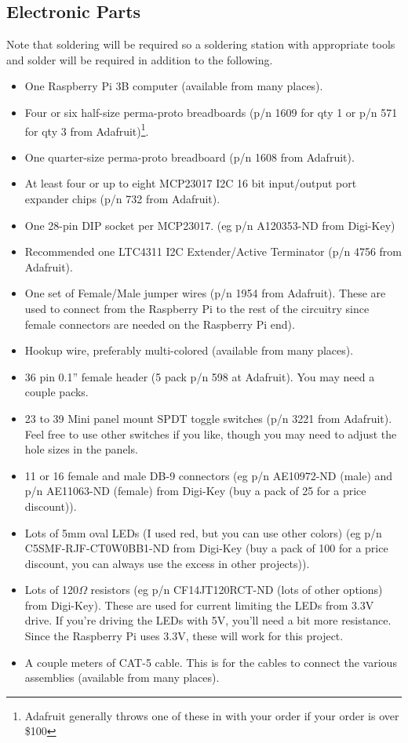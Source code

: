\documentclass[10pt, openany]{book}
\begin{document}
\subsection{Electronic Parts}
Note that soldering will be required so a soldering station with appropriate tools and solder will be required in addition to the following.
\begin{itemize}
  \item One Raspberry Pi 3B computer (available from many places).
  \item Four or six half-size perma-proto breadboards (p/n 1609 for qty 1 or p/n 571 for qty 3 from Adafruit)\footnote{Adafruit generally throws one of these in with your order if your order is over \$100}.
  \item One quarter-size perma-proto breadboard (p/n 1608 from Adafruit).
  \item At least four or up to eight MCP23017 I2C 16 bit input/output port expander chips (p/n 732 from Adafruit).
  \item One 28-pin DIP socket per MCP23017.  (eg p/n A120353-ND from Digi-Key)
  \item Recommended one LTC4311 I2C Extender/Active Terminator (p/n 4756 from Adafruit).
  \item One set of Female/Male jumper wires (p/n 1954 from Adafruit).  These are used to connect from the Raspberry Pi to the rest of the circuitry since female connectors are needed on the Raspberry Pi end).
  \item Hookup wire, preferably multi-colored (available from many places).
  \item 36 pin 0.1'' female header (5 pack p/n 598 at Adafruit).  You may need a couple packs.
  \item 23 to 39 Mini panel mount SPDT toggle switches (p/n 3221 from Adafruit).  Feel free to use other switches if you like, though you may need to adjust the hole sizes in the panels.
  \item 11 or 16 female and male DB-9 connectors (eg p/n AE10972-ND (male) and p/n AE11063-ND (female) from Digi-Key (buy a pack of 25 for a price discount)).
  \item Lots of 5mm oval LEDs (I used red, but you can use other colors) (eg p/n C5SMF-RJF-CT0W0BB1-ND from Digi-Key (buy a pack of 100 for a price discount, you can always use the excess in other projects)).
  \item Lots of 120$\Omega$ resistors (eg p/n CF14JT120RCT-ND (lots of other options) from Digi-Key).  These are used for current limiting the LEDs from 3.3V drive.  If you're driving the LEDs with 5V, you'll need a bit more resistance.  Since the Raspberry Pi uses 3.3V, these will work for this project.
  \item A couple meters of CAT-5 cable.  This is for the cables to connect the various assemblies (available from many places).
\end{itemize}
\end{document}
